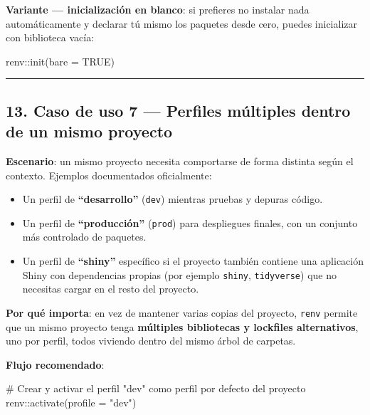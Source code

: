 \documentclass[
  man,
  floatsintext,
  longtable,
  a4paper,
  nolmodern,
  notxfonts,
  notimes,
  12pt,
  colorlinks=true,linkcolor=blue,citecolor=blue,urlcolor=blue]{apa7}
\newenvironment{Shaded}{\begin{snugshade}}{\end{snugshade}}
\newcommand{\AttributeTok}[1]{\textcolor[rgb]{0.40,0.45,0.13}{#1}}
\newcommand{\CommentTok}[1]{\textcolor[rgb]{0.37,0.37,0.37}{#1}}
\newcommand{\ConstantTok}[1]{\textcolor[rgb]{0.56,0.35,0.01}{#1}}
\newcommand{\FunctionTok}[1]{\textcolor[rgb]{0.28,0.35,0.67}{#1}}
\newcommand{\NormalTok}[1]{\textcolor[rgb]{0.00,0.23,0.31}{#1}}
\newcommand{\SpecialCharTok}[1]{\textcolor[rgb]{0.37,0.37,0.37}{#1}}
\newcommand{\StringTok}[1]{\textcolor[rgb]{0.13,0.47,0.30}{#1}}
\providecommand{\tightlist}{%
  \setlength{\itemsep}{0pt}\setlength{\parskip}{0pt}}
\begin{document}
\textbf{Variante --- inicialización en blanco}: si prefieres no instalar
nada automáticamente y declarar tú mismo los paquetes desde cero, puedes
inicializar con biblioteca vacía:

\begin{Shaded}
\begin{Highlighting}[]
\NormalTok{renv}\SpecialCharTok{::}\FunctionTok{init}\NormalTok{(}\AttributeTok{bare =} \ConstantTok{TRUE}\NormalTok{)}
\end{Highlighting}
\end{Shaded}

\begin{center}\rule{0.5\linewidth}{0.5pt}\end{center}

\subsection{13. Caso de uso 7 --- Perfiles múltiples dentro de un mismo
proyecto}\label{caso-de-uso-7-perfiles-muxfaltiples-dentro-de-un-mismo-proyecto}

\textbf{Escenario}: un mismo proyecto necesita comportarse de forma
distinta según el contexto. Ejemplos documentados oficialmente:

\begin{itemize}
\tightlist
\item
  Un perfil de \textbf{``desarrollo''} (\texttt{dev}) mientras pruebas y
  depuras código.
\item
  Un perfil de \textbf{``producción''} (\texttt{prod}) para despliegues
  finales, con un conjunto más controlado de paquetes.
\item
  Un perfil de \textbf{``shiny''} específico si el proyecto también
  contiene una aplicación Shiny con dependencias propias (por ejemplo
  \texttt{shiny}, \texttt{tidyverse}) que no necesitas cargar en el
  resto del proyecto.
\end{itemize}

\textbf{Por qué importa}: en vez de mantener varias copias del proyecto,
\texttt{renv} permite que un mismo proyecto tenga \textbf{múltiples
bibliotecas y lockfiles alternativos}, uno por perfil, todos viviendo
dentro del mismo árbol de carpetas.

\textbf{Flujo recomendado}:

\begin{Shaded}
\begin{Highlighting}[]
\CommentTok{\# Crear y activar el perfil "dev" como perfil por defecto del proyecto}
\NormalTok{renv}\SpecialCharTok{::}\FunctionTok{activate}\NormalTok{(}\AttributeTok{profile =} \StringTok{"dev"}\NormalTok{)}
\end{Highlighting}
\end{Shaded}
\end{document}
